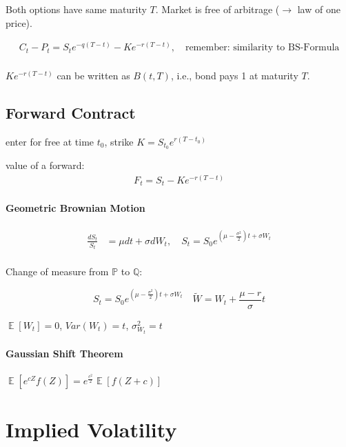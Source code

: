 \documentclass[a4paper, DIV19,12pt]{scrartcl}
\DeclareMathOperator{\E}{\mathbb{E}}
\newcommand{\bparens}  [1]{\left(       #1 \right)      } %
\begin{document}
Both options have same maturity $T$. Market is free of arbitrage ($\rightarrow$ law of one price).

\begin{eqnarray}
C_t - P_t = S_t e^{- q\bparens{T - t}} - K e^{- r\bparens{T - t}}, \quad \text{remember: similarity to BS-Formula}\\
\end{eqnarray}

$K e^{- r\bparens{T - t}}$ can be written as $B\bparens{t, T}$, i.e., bond pays 1 at maturity $T$.

\subsection{Forward Contract}

enter for free at time $t_0$, strike $K = S_{t_0} e^{r \bparens{T-t_0}}$

value of a forward:
\begin{eqnarray}
F_t = S_t - K e^{-r \bparens{T- t}}
\end{eqnarray}

\paragraph{Geometric Brownian Motion}

\begin{align}
\frac{dS_t}{S_t} &= \mu dt + \sigma dW_t, \quad S_t = S_0 e^{\bparens{\mu - \frac{\sigma^2}{2}} t + \sigma W_t}\\
\end{align}

Change of measure from $\mathbb{P}$ to $\mathbb{Q}$:

\begin{equation}
S_t = S_0 e^{\bparens{\mu - \frac{\sigma^2}{2}} t + \sigma W_t} \quad \widetilde{W} = W_t + \frac{\mu -r}{\sigma} t
\end{equation}


$\E[W_t] = 0$, \quad ${Var}(W_t) = t$, \quad $\sigma^2_{W_t} = t$

\paragraph{Gaussian Shift Theorem}

$\E[e^{cZ} f(Z)] = e^{\frac{c^2}{2}} \E[f(Z+c)]$

\section{Implied Volatility}
\end{document}
